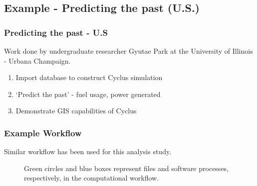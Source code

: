 \subsection{Example - Predicting the past (U.S.)}

\begin{frame}
    \frametitle{Predicting the past - U.S}
    Work done by undergraduate researcher Gyutae Park at the University of Illinois - Urbana Champaign.
    \begin{enumerate}
        \item Import database to construct Cyclus simulation
        \item `Predict the past' - fuel usage, power generated
        \item Demonstrate GIS capabilities of Cyclus
    \end{enumerate}
\end{frame}


\begin{frame}
    \frametitle{Example Workflow}
    Similar workflow has been used for this analysis study.
\begin{figure}
\caption{Green circles and blue boxes represent files and software 
processes, respectively, in the computational workflow.}
\label{diag:comp}
\end{figure}

\end{frame}

